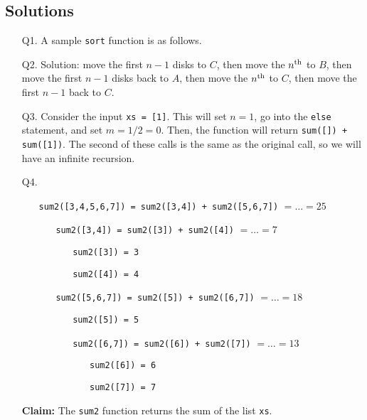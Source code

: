 \documentclass[a4paper,11pt]{article}
\begin{document}
\subsection*{Solutions}

\begin{enumerate}
\item[Q1.]
A sample {\tt sort} function is as follows.


\item[Q2.]
Solution: move the first $n-1$ disks to $C$, then move
the $n^{\rm th}$ to $B$, then move the first $n-1$ disks back to $A$, then move the
$n^{\rm th}$ to $C$, then move the first $n-1$ back to $C$.


\item[Q3.]
Consider the input {\tt xs = [1]}. This will set $n = 1$, go into the {\tt else}
statement, and set $m = 1 / 2 = 0$.
Then, the function will return {\tt sum([]) + sum([1])}. The second of these
calls is the same as the original call, so we will have an infinite recursion.

\item[Q4.]
\begin{itemize}
\item[]
{\tt sum2([3,4,5,6,7]) = sum2([3,4]) + sum2([5,6,7])} $= \dots = 25$
\begin{itemize}
\item[]
{\tt sum2([3,4]) = sum2([3]) + sum2([4])} $= \dots = 7$
\begin{itemize}
\item[]
{\tt sum2([3]) = 3}
\item[]
{\tt sum2([4]) = 4}
\end{itemize}
\item[]
{\tt sum2([5,6,7]) = sum2([5]) + sum2([6,7])} $= \dots = 18$
\begin{itemize}
\item[]
{\tt sum2([5]) = 5}
\item[]
{\tt sum2([6,7]) = sum2([6]) + sum2([7])} $= \dots = 13$
\begin{itemize}
\item[]
{\tt sum2([6]) = 6}
\item[]
{\tt sum2([7]) = 7}
\end{itemize}
\end{itemize}
\end{itemize}
\end{itemize}

{\bf Claim:} The {\tt sum2} function returns the sum of the list {\tt xs}.


\end{enumerate}
\end{document}

